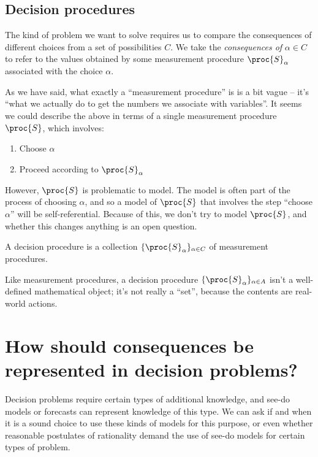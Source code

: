 \subsection{Decision procedures}\label{sec:actions}

The kind of problem we want to solve requires us to compare the consequences of different choices from a set of possibilities $C$. We take the \emph{consequences of} $\alpha\in C$ to refer to the values obtained by some measurement procedure $\proc{S}_\alpha$ associated with the choice $\alpha$.

As we have said, what exactly a ``measurement procedure'' is is a bit vague -- it's ``what we actually do to get the numbers we associate with variables''. It seems we could describe the above in terms of a single measurement procedure $\proc{S}$, which involves:

\begin{enumerate}
    \item Choose $\alpha$
    \item Proceed according to $\proc{S}_\alpha$
\end{enumerate}

However, $\proc{S}$ is problematic to model. The model is often part of the process of choosing $\alpha$, and so a model of $\proc{S}$ that involves the step ``choose $\alpha$'' will be self-referential. Because of this, we don't try to model $\proc{S}$, and whether this changes anything is an open question.

\begin{definition}
A decision procedure is a collection $\{\proc{S}_\alpha\}_{\alpha\in C}$ of measurement procedures.
\end{definition}

Like measurement procedures, a decision procedure $\{\proc{S}_\alpha\}_{\alpha\in A}$ isn't a well-defined mathematical object; it's not really a ``set'', because the contents are real-world actions.

\section{How should consequences be represented in decision problems?}\label{sec:how_represent_conseqeunces}

Decision problems require certain types of additional knowledge, and see-do models or forecasts can represent knowledge of this type. We can ask if and when it is a sound choice to use these kinds of models for this purpose, or even whether reasonable postulates of rationality demand the use of see-do models for certain types of problem.

